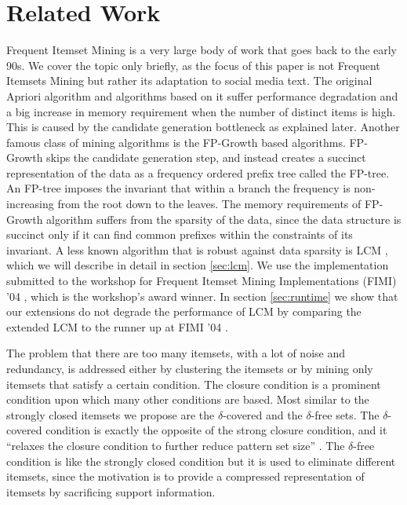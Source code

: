 \documentclass{sig-alternate}
\begin{document}
\section{Related Work}
\label{sec:related}
Frequent Itemset Mining is a very large body of work that goes back to the early 90s. We cover the topic only briefly, as the focus of this paper is not Frequent Itemsets Mining but rather its adaptation to social media text. The original Apriori algorithm \cite{agrawal1994fast} and algorithms based on it suffer performance degradation and a big increase in memory requirement when the number of distinct items is high. This is caused by the candidate generation bottleneck as explained later. Another famous class of mining algorithms is the FP-Growth \cite{han2000mining} based algorithms. FP-Growth  skips the candidate generation step, and instead creates a succinct representation of the data as a frequency ordered prefix tree called the FP-tree. An FP-tree imposes the invariant that within a branch the frequency is non-increasing from the root down to the leaves. 
The memory requirements of FP-Growth algorithm suffers from the sparsity of the data, since the data structure is succinct only if it can find common prefixes within the constraints of its invariant. 
A less known algorithm that is robust against data sparsity is LCM \cite{uno2004lcm}, which we will describe in detail in section \ref{sec:lcm}. We use the implementation submitted to the workshop for Frequent Itemset Mining Implementations (FIMI) '04 \cite{DBLP:conf/fimi/2004}, which is the workshop's award winner. In section \ref{sec:runtime} we show that our extensions do not degrade the performance of LCM by comparing the extended LCM to the runner up at FIMI '04 \cite{grahne2004reducing}. 

The problem that there are too many itemsets, with a lot of noise and redundancy, is addressed either by clustering \cite{yan2005summarizing} the itemsets or by mining only itemsets that satisfy a certain condition. The closure condition \cite{pasquier1999discovering} is a prominent condition upon which many other conditions are based. Most similar to the strongly closed itemsets we  propose are the $\delta$-covered \cite{xin2005mining} and the $\delta$-free \cite{boulicaut2003free} sets. The $\delta$-covered condition is exactly the opposite of the strong closure condition, and it ``relaxes the closure condition to further reduce pattern set size'' \cite{liu2012finding}. The $\delta$-free condition is like the strongly closed condition but it is used to eliminate different itemsets, since the motivation is to provide a compressed representation of itemsets by sacrificing support information. 
\end{document}

